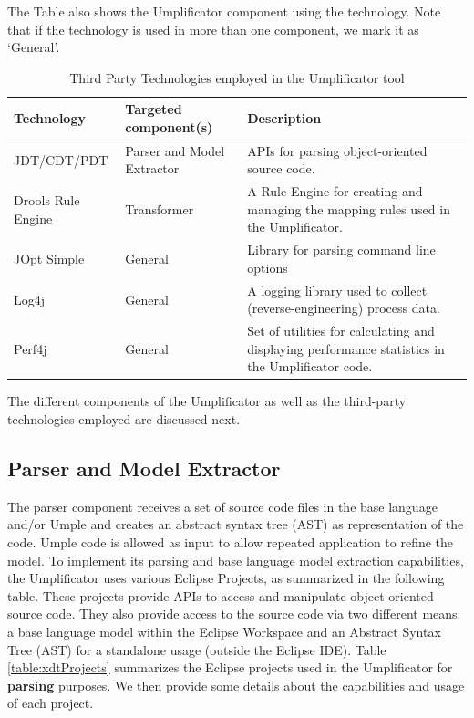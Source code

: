 The Table also shows the Umplificator component using the technology. Note that if the technology is used in more than one component, we mark it as `General'.

\begin{table}[h]
\caption{Third Party Technologies employed in the Umplificator tool}
\label{table:technologies}
\begin{tabularx}{\textwidth}{l|YY}
\toprule
{}
\textbf{Technology} & \textbf{Targeted component(s)}  & \textbf{Description}  \\ \hline
JDT/CDT/PDT  & Parser and Model Extractor & APIs for parsing object-oriented source code.\\ \hline 
Drools Rule Engine & Transformer  & A Rule Engine for creating and managing the mapping rules used in the Umplificator.	 \\ \hline	
JOpt Simple & General  & Library for parsing command line options \\ \hline	
Log4j & General & A logging library used to collect (reverse-engineering) process data.	\\ \hline	
Perf4j & General & Set of utilities for calculating and displaying performance statistics in the Umplificator code. \\ \hline	
\end{tabularx}
\end{table}

The different components of the Umplificator as well as the third-party technologies employed are discussed next. 

\subsection{Parser and Model Extractor}

The parser component receives a set of source code files in the base language and/or Umple and creates an abstract syntax tree (AST) as representation of the code. Umple code is allowed as input to allow repeated application to refine the model. To implement its parsing and base language model extraction capabilities, the Umplificator uses various Eclipse Projects, as summarized in the following table. These projects provide APIs to access and manipulate object-oriented source code.
They also provide access to the  source code via two different means: a base language model within the Eclipse Workspace and an Abstract Syntax Tree (AST) for a standalone usage (outside the Eclipse IDE). Table \ref{table:xdtProjects} summarizes the Eclipse projects used in the Umplificator for \textbf{parsing} purposes. We then provide some details about the capabilities and usage of each project. 


